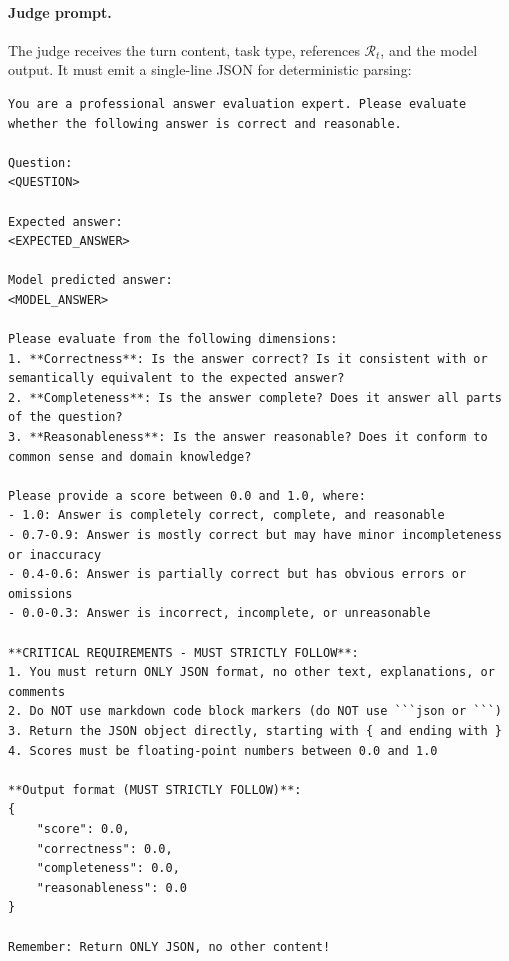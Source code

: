\begingroup
{}
\lstset{style=xdbenchjudge}

\paragraph{Judge prompt.}
The judge receives the turn content, task type, references $\mathcal{R}_t$, and the model output.
It must emit a single-line JSON for deterministic parsing:
\\
\begin{lstlisting}[frame=single]
You are a professional answer evaluation expert. Please evaluate whether the following answer is correct and reasonable.

Question:
<QUESTION>

Expected answer:
<EXPECTED_ANSWER>

Model predicted answer:
<MODEL_ANSWER>

Please evaluate from the following dimensions:
1. **Correctness**: Is the answer correct? Is it consistent with or semantically equivalent to the expected answer?
2. **Completeness**: Is the answer complete? Does it answer all parts of the question?
3. **Reasonableness**: Is the answer reasonable? Does it conform to common sense and domain knowledge?

Please provide a score between 0.0 and 1.0, where:
- 1.0: Answer is completely correct, complete, and reasonable
- 0.7-0.9: Answer is mostly correct but may have minor incompleteness or inaccuracy
- 0.4-0.6: Answer is partially correct but has obvious errors or omissions
- 0.0-0.3: Answer is incorrect, incomplete, or unreasonable

**CRITICAL REQUIREMENTS - MUST STRICTLY FOLLOW**:
1. You must return ONLY JSON format, no other text, explanations, or comments
2. Do NOT use markdown code block markers (do NOT use ```json or ```)
3. Return the JSON object directly, starting with { and ending with }
4. Scores must be floating-point numbers between 0.0 and 1.0

**Output format (MUST STRICTLY FOLLOW)**:
{
    "score": 0.0,
    "correctness": 0.0,
    "completeness": 0.0,
    "reasonableness": 0.0
}

Remember: Return ONLY JSON, no other content!
\end{lstlisting}

